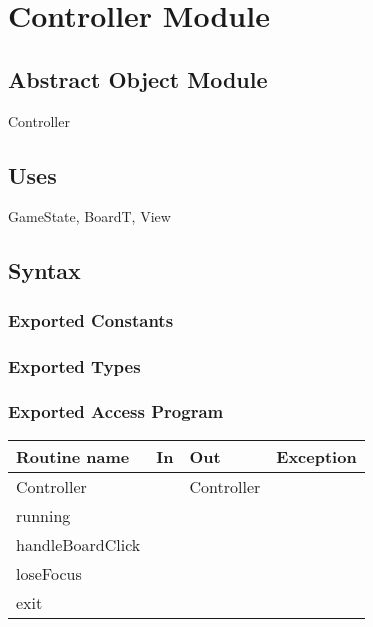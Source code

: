 \documentclass[11pt]{article}
\begin{document}
\section{Controller Module}
\label{sec:org7ab6df3}
\subsection*{Abstract Object Module}
\label{sec:org33a7dc6}
Controller
\subsection*{Uses}
\label{sec:orgd25b5d4}
GameState, BoardT, View
\subsection*{Syntax}
\label{sec:org46323d8}
\subsubsection*{Exported Constants}
\label{sec:org7d38a2a}
\subsubsection*{Exported Types}
\label{sec:orgb82c852}
\subsubsection*{Exported Access Program}
\label{sec:orge970f68}
\begin{center}
\begin{tabular}{l|l|l|l}
Routine name & In & Out & Exception\\
\hline
Controller &  & Controller & \\
running &  &  & \\
handleBoardClick &  &  & \\
loseFocus &  &  & \\
exit &  &  & \\
\end{tabular}
\end{center}
\end{document}
